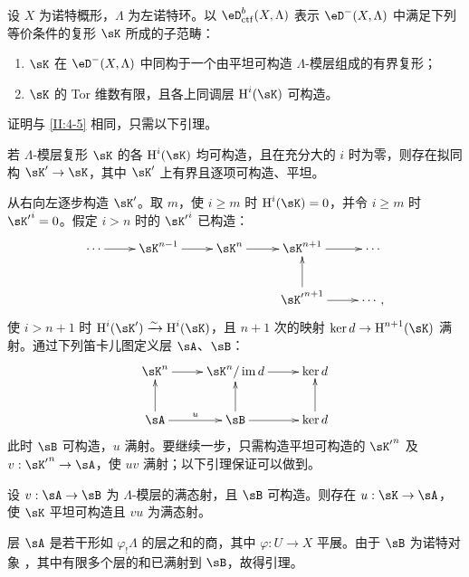 \begin{prop-def_}\label{II:4-6}
设 $X$ 为诺特概形，$\Lambda$ 为左诺特环。以 $\eD_{\mathrm{ctf}}^b(X,\Lambda)$ 表示 $\eD^-(X,\Lambda)$ 中满足下列等价条件的复形 $\sK$ 所成的子范畴：
\begin{enumerate}[\indent i)]
\item $\sK$ 在 $\eD^-(X,\Lambda)$ 中同构于一个由平坦可构造 $\Lambda$-模层组成的有界复形；
\item $\sK$ 的 Tor 维数有限，且各上同调层 $\h^i(\sK)$ 可构造。
\end{enumerate}
\end{prop-def_}
证明与 \ref{II:4-5} 相同，只需以下引理。
\begin{lemma_}\label{II:4-7}
若 $\Lambda$-模层复形 $\sK$ 的各 $\h^i(\sK)$ 均可构造，且在充分大的 $i$ 时为零，则存在拟同构 $\sK'\to\sK$，其中 $\sK'$ 上有界且逐项可构造、平坦。
\end{lemma_}
从右向左逐步构造 $\sK'$。取 $m$，使 $i\geqslant m$ 时 $\h^i(\sK)=0$，并令 $i\geqslant m$ 时 ${\sK'}^i=0$。假定 $i>n$ 时的 ${\sK'}^i$ 已构造：
\[\xymatrix{\cdots\ar[r]&\sK^{n-1}\ar[r]&\sK^n\ar[r]&\sK^{n+1}\ar[r]&\cdots\\&&&{\sK'}^{n+1}\ar[u]\ar[r]&\cdots,}\]
使 $i>n+1$ 时 $\h^i(\sK')\iso\h^i(\sK)$，且 $n+1$ 次的映射 $\ker d\to\h^{n+1}(\sK)$ 满射。通过下列笛卡儿图定义层 $\sA$、$\sB$：
\[\xymatrix{\sK^n\ar[r]&\sK^n/\im d\ar[r]&\ker d\\\sA\ar[u]\ar[r]^u&\sB\ar[u]\ar[r]&\ker d\ar[u].}\]
此时 $\sB$ 可构造，$u$ 满射。要继续一步，只需构造平坦可构造的 ${\sK'}^n$ 及 $v:{\sK'}^n\to\sA$，使 $uv$ 满射；以下引理保证可以做到。
\begin{lemma_}\label{II:4-8}
设 $v:\sA\to\sB$ 为 $\Lambda$-模层的满态射，且 $\sB$ 可构造。则存在 $u:\sK\to\sA$，使 $\sK$ 平坦可构造且 $vu$ 为满态射。
\end{lemma_}
层 $\sA$ 是若干形如 $\varphi_!\Lambda$ 的层之和的商，其中 $\varphi:U\to X$ 平展。由于 $\sB$ 为诺特对象 \cite[IX.2.10]{sga4}，其中有限多个层的和已满射到 $\sB$，故得引理。

